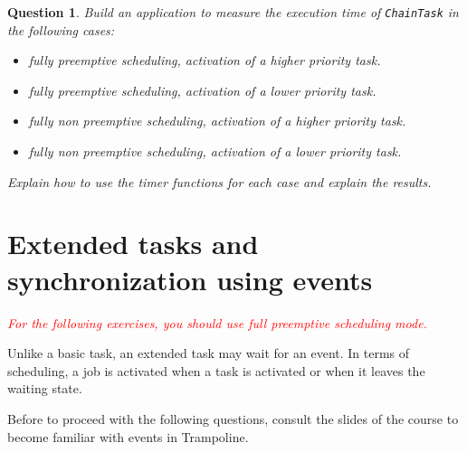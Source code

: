 \documentclass[11pt]{report}
\newtheorem{ex}{Question}
\begin{document}
\begin{ex}
    Build an application to measure the execution time of \texttt{ChainTask} in the following cases:
    \begin{itemize}
        \item fully preemptive scheduling, activation of a higher priority task.
        \item fully preemptive scheduling, activation of a lower priority task.
        \item fully non preemptive scheduling, activation of a higher priority task.
        \item fully non preemptive scheduling, activation of a lower priority task.
    \end{itemize}

    Explain how to use the timer functions for each case and explain the results.
\end{ex}

\section{Extended tasks and synchronization using events}

\textcolor{red}{\emph{For the following exercises, you should use full preemptive scheduling mode.}}

Unlike a basic task, an extended task may wait for an event.
In terms of scheduling, a job is activated when a task is activated or when it leaves the waiting state.

Before to proceed with the following questions, consult the slides of the course to become familiar with events in Trampoline.

\end{document}
